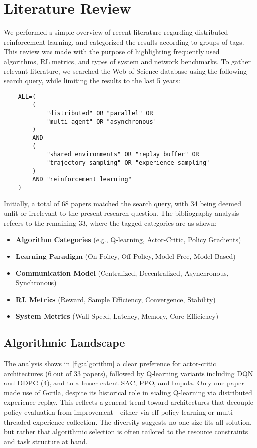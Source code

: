 \section{Literature Review}
\label{sec:literature_review}

We performed a simple overview of recent literature regarding distributed reinforcement learning,
and categorized the results according to groups of tags.
This review was made with the purpose of highlighting frequently used algorithms, RL metrics,
and types of system and network benchmarks.
To gather relevant literature, we searched the Web of Science database using the following search query,
while limiting the results to the last 5 years:

\begin{verbatim}
    ALL=(
        (
            "distributed" OR "parallel" OR
            "multi-agent" OR "asynchronous"
        )
        AND
        (
            "shared environments" OR "replay buffer" OR
            "trajectory sampling" OR "experience sampling"
        )
        AND "reinforcement learning"
    )
\end{verbatim}

Initially, a total of 68 papers matched the search query, with 34 being deemed unfit or irrelevant to the
present research question.
The bibliography analysis refeers to the remaining 33, where the tagged categories are as shown:

\begin{itemize}[leftmargin=*, label={--}]
    \item \textbf{Algorithm Categories} (e.g., Q-learning, Actor-Critic, Policy Gradients)
    \item \textbf{Learning Paradigm} (On-Policy, Off-Policy, Model-Free, Model-Based)
    \item \textbf{Communication Model} (Centralized, Decentralized, Asynchronous, Synchronous)
    \item \textbf{RL Metrics} (Reward, Sample Efficiency, Convergence, Stability)
    \item \textbf{System Metrics} (Wall Speed, Latency, Memory, Core Efficiency)
\end{itemize}

\subsection{Algorithmic Landscape}

The analysis shows in \autoref{fig:algorithm} a clear preference for actor-critic architectures (6 out of 33 papers), followed by Q-learning variants including DQN and DDPG (4),
and to a lesser extent SAC, PPO, and Impala.
Only one paper made use of Gorila, despite its historical role in scaling Q-learning via distributed experience replay.
This reflects a general trend toward architectures that decouple policy evaluation from improvement—either via off-policy learning or multi-threaded experience collection.
The diversity suggests no one-size-fits-all solution, but rather that algorithmic selection is often tailored to the resource constraints and task structure at hand.

